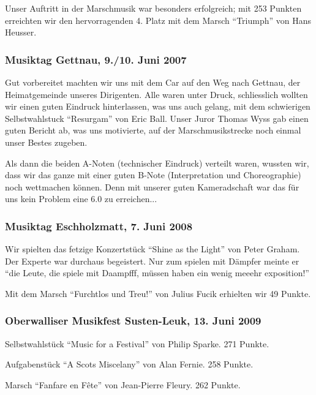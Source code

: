\begin{history}
    Unser Auftritt in der Marschmusik war besonders erfolgreich; mit 253 Punkten
    erreichten wir den hervorragenden 4. Platz mit dem Marsch \enquote{Triumph}
    von Hans Heusser.


    \subsubsection*{Musiktag Gettnau, 9./10. Juni 2007}

    Gut vorbereitet machten wir uns mit dem Car auf den Weg nach Gettnau, der
    Heimatgemeinde unseres Dirigenten. Alle waren unter Druck, schliesslich
    wollten wir einen guten Eindruck hinterlassen, was uns auch gelang, mit dem
    schwierigen Selbstwahlstuck \enquote{Resurgam} von Eric Ball. Unser Juror
    Thomas Wyss gab einen guten Bericht ab, was uns motivierte, auf der
    Marschmusikstrecke noch einmal unser Bestes zugeben.

    Als dann die beiden A-Noten (technischer Eindruck) verteilt waren, wussten
    wir, dass wir das ganze mit einer guten B-Note (Interpretation und
    Choreographie) noch wettmachen können. Denn mit unserer guten Kameradschaft
    war das für uns kein Problem eine 6.0 zu erreichen...


    \subsubsection*{Musiktag Eschholzmatt, 7. Juni 2008}

    Wir spielten das fetzige Konzertstück \enquote{Shine as the Light} von Peter
    Graham. Der Experte war durchaus begeistert. Nur zum spielen mit Dämpfer
    meinte er \enquote{die Leute, die spiele mit Daampfff, müssen haben ein
        wenig meeehr exposition!}

    Mit dem Marsch \enquote{Furchtlos und Treu!} von Julius Fucik erhielten wir
    49 Punkte.


    \subsubsection*{Oberwalliser Musikfest Susten-Leuk, 13. Juni 2009}

    Selbstwahlstück   \enquote{Music for a Festival} von Philip Sparke. 271
    Punkte.

    Aufgabenstück \enquote{A Scots Miscelany} von Alan Fernie. 258 Punkte.

    Marsch \enquote{Fanfare en Fête} von Jean-Pierre Fleury. 262 Punkte.



\end{history}
